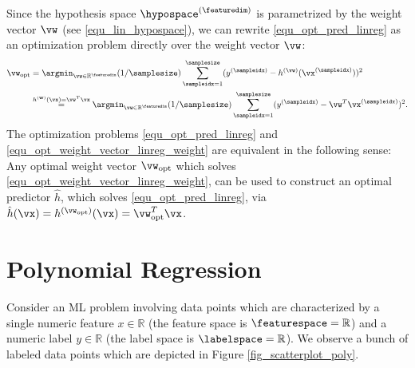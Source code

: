 \documentclass[12pt]{report}
\begin{document}
Since the hypothesis space $\hypospace^{(\featuredim)} $ is 
parametrized by the weight vector $\vw$ (see \eqref{equ_lin_hypospace}), 
we can rewrite \eqref{equ_opt_pred_linreg} as an optimization 
problem directly over the weight vector $\vw$: 
\begin{align} 
\label{equ_opt_weight_vector_linreg_weight}
\vw_{\rm opt} &  = \argmin_{\vw \in \mathbb{R}^{\featuredim}} (1/\samplesize) \sum_{\sampleidx=1}^{\samplesize} (y^{(\sampleidx)} - h^{(\vw)}(\vx^{(\sampleidx)}))^{2} \nonumber \\
& \stackrel{h^{(\mathbf{w})}(\vx) = \vw^{T} \vx}{=} \argmin_{\vw \in \mathbb{R}^{\featuredim}} (1/\samplesize) \sum_{\sampleidx=1}^{\samplesize} (y^{(\sampleidx)} - \vw^{T} \vx^{(\sampleidx)})^{2}.
\end{align} 
The optimization problems \eqref{equ_opt_pred_linreg} and \eqref{equ_opt_weight_vector_linreg_weight} 
are equivalent in the following sense: Any optimal weight vector $\vw_{\rm opt}$ which solves 
\eqref{equ_opt_weight_vector_linreg_weight}, can be used to 
construct an optimal predictor $\hat{h}$, which solves 
\eqref{equ_opt_pred_linreg}, via $\hat{h}(\vx) = h^{(\vw_{\rm opt})}(\vx) = \vw_{\rm opt}^{T} \vx$. 


\section{Polynomial Regression} 
\label{sec_polynomial_regression}


Consider an ML problem involving data points which are characterized by a 
single numeric feature $x \in  \mathbb{R}$ (the feature space is $\featurespace= \mathbb{R}$) 
and a numeric label $y \in \mathbb{R}$ (the label space is $\labelspace= \mathbb{R}$). 
We observe a bunch of labeled data points which are depicted in Figure \ref{fig_scatterplot_poly}. 
\end{document}
